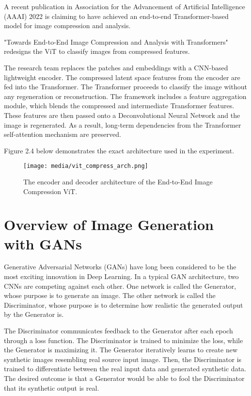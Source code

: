 A recent publication in Association for the Advancement of Artificial Intelligence (AAAI) 2022 is
claiming to have achieved an end-to-end Transformer-based model for image compression and analysis.

"Towards End-to-End Image Compression and Analysis with Transformers" redesigns the ViT
to classify images from compressed features. \citep{Bai2022AAAI}

The research team replaces the patches and embeddings with a CNN-based lightweight encoder. 
The compressed latent space features from the encoder are fed into the Transformer.
The Transformer proceeds to classify the image without any regeneration or reconstruction. 
The framework includes a feature aggregation module, which blends the compressed and intermediate Transformer features. 
These features are then passed onto a Deconvolutional Neural Network 
and the image is regenerated. As a result, long-term dependencies from the Transformer self-attention mechanism 
are preserved.

Figure 2.4 below demonstrates the exact architecture used in the experiment.

\begin{figure}[H]
	\begin{center}
	\texttt{[image: media/vit\_compress\_arch.png]}
	\end{center}
	\caption[End-to-End Image Compression ViT]{The encoder and decoder architecture of the  
    End-to-End Image Compression ViT. \citep{Bai2022AAAI}}
	\end{figure}

\section{Overview of Image Generation with GANs}

Generative Adversarial Networks (GANs) have long been considered to be 
the most exciting innovation in Deep Learning. In a typical GAN architecture, 
two CNNs are competing against each other. One network is called the Generator, whose purpose is to 
generate an image. The other network is called the Discriminator, whose purpose is to determine 
how realistic the generated output by the Generator is. 

The Discriminator communicates feedback to the Generator after each epoch through a loss function.
The Discriminator is trained to minimize the loss, while the Generator is maximizing it.
The Generator iteratively learns to create new synthetic images resembling real source input image.
Then, the Discriminator is trained to differentiate between the real input data and generated synthetic data. 
The desired outcome is that a Generator would be able to fool the Discriminator that its synthetic output
is real. \citep{GANs} 


